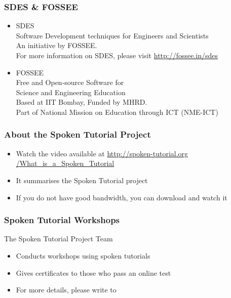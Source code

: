 \documentclass[17pt,compress]{beamer}
\begin{document}
\begin{frame}
\frametitle{SDES \& FOSSEE}
\begin{center}
\begin{itemize}
\item \small{SDES}\\
\small{\color{LimeGreen}Software Development techniques for Engineers and Scientists} \\
\scriptsize An initiative by FOSSEE. \\
\vspace{3pt}
\scriptsize For more information on SDES, please visit {\color{blue}\url{http://fossee.in/sdes}}\\
\vspace{12pt}
\item \small{FOSSEE}\\
\small {\color{LimeGreen}Free and Open-source Software for \\Science and Engineering Education} \\
\scriptsize Based at IIT Bombay, Funded by MHRD.\\
\vspace{3pt}
\scriptsize Part of National Mission on Education through ICT (NME-ICT) \\
\end{itemize}
\end{center}
\end{frame}

\begin{frame}
\frametitle{About the Spoken Tutorial Project}
\begin{itemize}
\item Watch the video available at {\color{blue}\url{http://spoken-tutorial.org /What\_is\_a\_Spoken\_Tutorial}} 
\item It summarises the Spoken Tutorial project 
\item If you do not have good bandwidth, you can download and watch it
\end{itemize}
\end{frame}

\begin{frame}
\frametitle{Spoken Tutorial Workshops}The Spoken Tutorial Project Team 
\begin{itemize}
\item Conducts workshops using spoken tutorials 
\item Gives certificates to those who pass an online test 
\item For more details, please write to \\ 
\end{itemize}
\end{frame}
\end{document}
